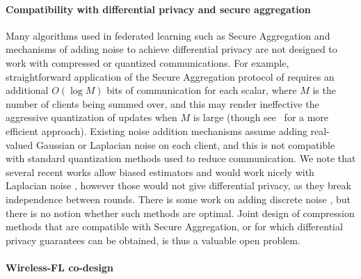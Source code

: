 \documentclass[11pt]{article}
\begin{document}
\paragraph{Compatibility with differential privacy and secure aggregation} Many algorithms used in federated learning such as Secure Aggregation \citep{bonawitz2016practical} and mechanisms of adding noise to achieve differential privacy \citep{abadi2016deep,mcmahan18dplm} are not designed to work with compressed or quantized communications. For example, straightforward application of the Secure Aggregation protocol of \citet{bonawitz17secagg,bell20secagg} requires an additional $O(\log M)$ bits of communication for each scalar, where $M$ is the number of clients being summed over, and this may render ineffective the aggressive quantization of updates when $M$ is large (though see~\cite{bonawitz2019autotune} for a more efficient approach). Existing noise addition mechanisms assume adding real-valued Gaussian or Laplacian noise on each client, and this is not compatible with standard quantization methods used to reduce communication. We note that several recent works  allow biased estimators and would work nicely with Laplacian noise \cite{stich2019error}, however those would not give differential privacy, as they break independence between rounds. There is some work on adding discrete noise \cite{agarwal2018cpsgd}, but there is no notion whether such methods are optimal. Joint design of compression methods that are compatible with Secure Aggregation, or for which differential privacy guarantees can be obtained, is thus a valuable open problem.


\paragraph{Wireless-FL co-design}
\end{document}
